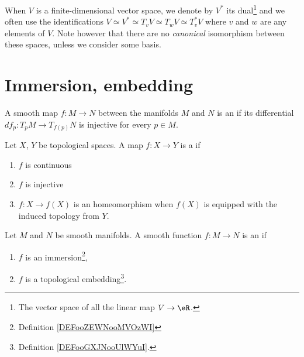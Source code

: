 When $V$ is a finite-dimensional vector space, we denote by $V^*$ its dual\footnote{The vector space of all the linear map $V\to \eR$.} and we often use the identifications $V\simeq V^*\simeq T_vV\simeq T_wV\simeq T^*_vV$ where $v$ and $w$ are any elements of $V$. Note however that there are no \emph{canonical} isomorphism between these spaces, unless we consider some basis.


\section{Immersion, embedding}


\begin{definition}    \label{DEFooZEWNooMVOzWI}
	A smooth map \( f\colon M\to N\) between the manifolds \( M\) and \( N\) is an  if its differential \( df_p\colon T_pM\to T_{f(p)}N\) is injective for every \( p\in M\).
\end{definition}

\begin{definition}		\label{DEFooGXJNooUlWYuI}
	Let \( X\), \( Y\) be topological spaces. A map \( f\colon X\to Y\) is a  if
	\begin{enumerate}
		\item
		      \( f\) is continuous
		\item
		      \( f\) is injective
		\item
		      \( f\colon X\to f(X)\) is an homeomorphism when \( f(X)\) is equipped with the induced topology from \( Y\).
	\end{enumerate}
\end{definition}

\begin{definition}       \label{DEFooQLGLooNyXaOV}
	Let \( M\) and \( N\) be smooth manifolds. A smooth function \( f\colon M\to N\) is an  if
	\begin{enumerate}
		\item
		      \( f\) is an immersion\footnote{Definition \ref{DEFooZEWNooMVOzWI}},
		\item
		      \( f\) is a topological embedding\footnote{Definition \ref{DEFooGXJNooUlWYuI}.}.
	\end{enumerate}
\end{definition}

